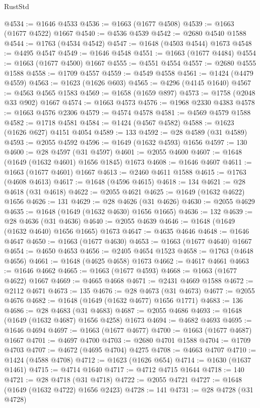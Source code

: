 \begin{lexlean}{RustStd}
\begin{coremodule}
{\begin{coremodule}
{{{{{{{{{{{{{{{{{{{{{{{{{{{{{{{{{{{{{{{{{{{{@4534 := @1646 @4533
@4536 := @1663 (@1677 @4508)
@4539 := @1663 (@1677 @4522) @1667
@4540 := @4536 @4539
@4542 := @2680 @4540 @1588
@4544 := @1763 (@4534 @4542)
@4547 := @1648 (@4503 @4544) @1673
@4548 := @4495 @4547
@4549 := @1646 @4548
@4551 := @1663 (@1677 @4484)
@4554 := @1663 (@1677 @4500) @1667
@4555 := @4551 @4554
@4557 := @2680 @4555 @1588
@4558 := @1709 @4557
@4559 := @4549 @4558
@4561 := @1424 (@4479 @4559)
@4563 := @1623 (@1626 @603)
@4565 := @4296 (@4145 @1640)
@4567 := @4563 @4565 @1583
@4569 := @1658 (@1659 @897)
@4573 := @1758 (@2048 @33 @902) @1667
@4574 := @1663 @4573
@4576 := @1968 @2330 @4383
@4578 := @1663 @4576 @2306
@4579 := @4574 @4578
@4581 := @4569 @4579 @1588
@4582 := @1718 @4581
@4584 := @1424 (@4567 @4582)
@4588 := @1623 (@1626 @627) @4151 @4054
@4589 := 133
@4592 := @28 @4589 (@31 @4589)
@4593 := @2055 @4592
@4596 := @1649 (@1632 @4593) @1656
@4597 := 130
@4600 := @28 @4597 (@31 @4597)
@4601 := @2055 @4600
@4607 := @1648 (@1649 (@1632 @4601) @1656 @1845) @1673
@4608 := @1646 @4607
@4611 := @1663 (@1677 @4601) @1667
@4613 := @2460 @4611 @1588
@4615 := @1763 (@4608 @4613)
@4617 := @1648 (@4596 @4615)
@4618 := 134
@4621 := @28 @4618 (@31 @4618)
@4622 := @2055 @4621
@4625 := @1649 (@1632 @4622) @1656
@4626 := 131
@4629 := @28 @4626 (@31 @4626)
@4630 := @2055 @4629
@4635 := @1648 (@1649 (@1632 @4630) @1656 @1665)
@4636 := 132
@4639 := @28 @4636 (@31 @4636)
@4640 := @2055 @4639
@4646 := @1648 (@1649 (@1632 @4640) @1656 @1665) @1673
@4647 := @4635 @4646
@4648 := @1646 @4647
@4650 := @1663 (@1677 @4630)
@4653 := @1663 (@1677 @4640) @1667
@4654 := @4650 @4653
@4656 := @2405 @4654 @1523
@4658 := @1763 (@4648 @4656)
@4661 := @1648 (@4625 @4658) @1673
@4662 := @4617 @4661
@4663 := @1646 @4662
@4665 := @1663 (@1677 @4593)
@4668 := @1663 (@1677 @4622) @1667
@4669 := @4665 @4668
@4671 := @2431 @4669 @1588
@4672 := @2112 @4671
@4673 := 135
@4676 := @28 @4673 (@31 @4673)
@4677 := @2055 @4676
@4682 := @1648 (@1649 (@1632 @4677) @1656 @1771)
@4683 := 136
@4686 := @28 @4683 (@31 @4683)
@4687 := @2055 @4686
@4693 := @1648 (@1649 (@1632 @4687) @1656 @4258) @1673
@4694 := @4682 @4693
@4695 := @1646 @4694
@4697 := @1663 (@1677 @4677)
@4700 := @1663 (@1677 @4687) @1667
@4701 := @4697 @4700
@4703 := @2680 @4701 @1588
@4704 := @1709 @4703
@4707 := @4672 (@4695 @4704) @4275
@4708 := @4663 @4707
@4710 := @1424 (@4588 @4708)
@4712 := @1623 (@1626 @654)
@4714 := @1630 (@1637 @1461)
@4715 := @4714 @1640
@4717 := @4712 @4715 @1644
@4718 := 140
@4721 := @28 @4718 (@31 @4718)
@4722 := @2055 @4721
@4727 := @1648 (@1649 (@1632 @4722) @1656 @2423)
@4728 := 141
@4731 := @28 @4728 (@31 @4728)
}}}}}}}}}}}}}}}}}}}}}}}}}}}}}}}}}}}}}}}}}}}}
\end{coremodule}}
\end{coremodule}
\end{lexlean}
